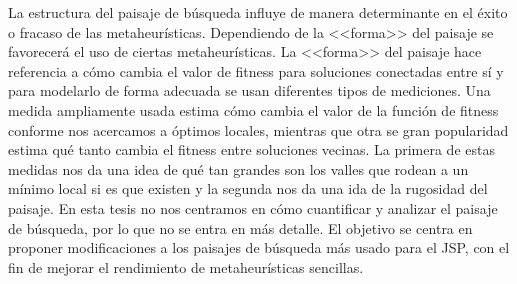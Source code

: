 La estructura del paisaje de búsqueda influye de manera determinante en el éxito o fracaso de las metaheurísticas. 
%
Dependiendo de la <<forma>> del paisaje se favorecerá el uso de ciertas metaheurísticas. 
%
La <<forma>> del paisaje hace referencia a cómo cambia el valor de fitness para soluciones conectadas entre sí y para modelarlo de forma adecuada se usan diferentes
tipos de mediciones.
%
Una medida ampliamente usada estima cómo cambia el valor de la función de fitness conforme nos acercamos a óptimos locales, mientras que otra se gran popularidad 
estima qué tanto cambia el fitness entre soluciones vecinas\cite{skauffman}. 
%
La primera de estas medidas nos da una idea de qué tan grandes son los valles que rodean a un mínimo local si es que existen y la segunda nos da una ida de la 
rugosidad del paisaje.
%
En esta tesis no nos centramos en cómo cuantificar y analizar el paisaje de búsqueda, por lo que no se entra en más detalle.
%
El objetivo se centra en proponer modificaciones a los paisajes de búsqueda más usado para el JSP, con el fin de mejorar el rendimiento de metaheurísticas sencillas.

